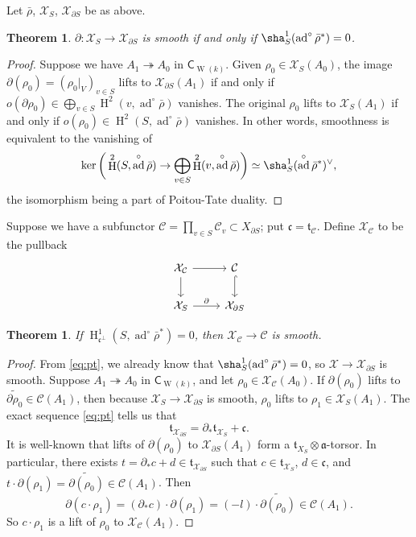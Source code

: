 \documentclass{article}
\DeclareMathOperator{\adjoint}{ad}
\DeclareMathOperator{\h}{H}
\DeclareMathOperator{\witt}{W}
\newcommand{\cC}{\mathcal{C}}
\newcommand{\cX}{\mathcal{X}}
\newcommand{\fa}{\mathfrak{a}}
\newcommand{\fc}{\mathfrak{c}}
\newcommand{\ft}{\mathfrak{t}}
\newcommand{\coef}{\mathsf{C}}
\newtheorem{theorem}[subsection]{Theorem}
\begin{document}
Let $\bar\rho$, $\cX_S$, $\cX_{\partial S}$ be as above. 

\begin{theorem}
$\partial\colon \cX_S\to \cX_{\partial S}$ is smooth if and only if 
$\sha^1_S(\adjoint^\circ\bar\rho^\ast)=0$. 
\end{theorem}
\begin{proof}
Suppose we have $A_1\twoheadrightarrow A_0$ in $\coef_{\witt(k)}$. Given 
$\rho_0\in \cX_S(A_0)$, the image $\partial(\rho_0)=(\rho_0|_V)_{v\in S}$ lifts to 
$\cX_{\partial S}(A_1)$ if and only if 
$o(\partial \rho_0)\in \bigoplus_{v\in S} \h^2(v,\adjoint^\circ\bar\rho)$ vanishes. 
The original $\rho_0$ lifts to $\cX_S(A_1)$ if and only if 
$o(\rho_0)\in \h^2(S,\adjoint^\circ\bar\rho)$ vanishes. In other words, smoothness 
is equivalent to the vanishing of 
\[
  \ker\bigg(\h^2(S,\adjoint^\circ\bar\rho)\to \bigoplus_{v\in S} \h^2(v,\adjoint^\circ\bar\rho)\bigg) \simeq \sha_S^1(\adjoint^\circ\bar\rho^\ast)^\vee ,
\]
the isomorphism being a part of Poitou-Tate duality. 
\end{proof}

Suppose we have a subfunctor 
$\cC=\prod_{v\in S} \cC_v\subset X_{\partial S}$; put $\fc=\ft_\cC$. Define $\cX_\cC$ to be the 
pullback 
\[\begin{tikzcd}
  \cX_\cC \ar[r] \ar[d] 
    & \cC \ar[d, hook] \\
  \cX_S \ar[r, "\partial"] 
    & \cX_{\partial S}
\end{tikzcd}\]

\begin{theorem}
If $\h^1_{\fc^\bot}(S,\adjoint^\circ\bar\rho^\ast)=0$, then $\cX_\cC\to \cC$ is smooth. 
\end{theorem}
\begin{proof}
From \eqref{eq:pt}, we already know that 
$\sha_S^1(\adjoint^\circ\bar\rho^\ast)=0$, so $\cX\to \cX_{\partial S}$ is 
smooth. Suppose $A_1\twoheadrightarrow A_0$ in $\coef_{\witt(k)}$, and let 
$\rho_0\in \cX_\cC(A_0)$. If $\partial(\rho_0)$ lifts to 
$\widetilde{\partial\rho_0}\in \cC(A_1)$, then because 
$\cX_S\to \cX_{\partial S}$ is smooth, $\rho_0$ lifts to 
$\rho_1\in \cX_S(A_1)$. The exact sequence \eqref{eq:pt} tells us that 
\[
  \ft_{\cX_{\partial S}} = \partial_\ast \ft_{\cX_S} + \fc .
\]
It is well-known that lifts of $\partial(\rho_0)$ to $\cX_{\partial S}(A_1)$ form a 
$\ft_{X_S}\otimes \fa$-torsor. In particular, there exists 
$t=\partial_\ast c+d\in \ft_{\cX_{\partial S}}$ such that $c\in \ft_{\cX_S}$, 
$d\in \fc$, and
$t\cdot \partial(\rho_1) = \widetilde{\partial(\rho_0)}\in \cC(A_1)$. Then 
\[
  \partial(c\cdot \rho_1) = (\partial_\ast c)\cdot \partial(\rho_1) = (-l)\cdot \widetilde{\partial(\rho_0)} \in \cC(A_1) .
\]
So $c\cdot\rho_1$ is a lift of $\rho_0$ to $\cX_\cC(A_1)$. 
\end{proof}
\end{document}
